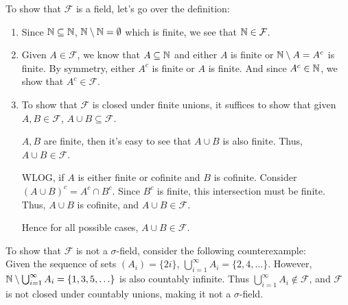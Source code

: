 \documentclass[12pt]{article}
\begin{document}
\begin{problem}[2]
	To show that $\mathcal{F}$ is a field, let's go over the definition:
	\begin{enumerate}[label=(\roman*)]
		\item Since $\mathbb{N} \subseteq \mathbb{N}$, $\mathbb{N} \setminus \mathbb{N} = \emptyset$ which is finite, we see that $\mathbb{N} \in \mathcal{F}$.
		\item Given $A \in \mathcal{F}$, we know that $A \subseteq \mathbb{N}$ and either $A$ is finite or  $\mathbb{N} \setminus A = A^{c}$ is finite. By symmetry, either $A^{c}$ is finite or $A$ is finite. And since  $A^{c} \in \mathbb{N}$, we show that $A^{c} \in \mathcal{F}$.
		\item To show that $\mathcal{F}$ is closed under finite unions, it suffices to show that given $A,B \in \mathcal{F}$, $A \cup B \subseteq \mathcal{F}$.
			~\begin{case}[1]
				$A,B$ are finite, then it's easy to see that  $A \cup  B$ is also finite. Thus, $A \cup B \in \mathcal{F}$.
			\end{case}
\begin{case}[2]
	WLOG, if $A$ is either finite or cofinite and $B$ is cofinite. Consider $(A \cup B)^{c} = A^{c} \cap B^{c}$. Since $B^{c}$ is finite, this intersection must be finite. Thus, $A \cup B$ is cofinite, and $A \cup B \in \mathcal{F}$.
\end{case} 
Hence for all possible cases, $A \cup B \in \mathcal{F}$.
	\end{enumerate}

	To show that $\mathcal{F}$ is not a $\sigma$-field, consider the following counterexample:\\

	Given the sequence of sets $(A_i) = \{2i\} $, $\bigcup_{i= 1}^{\infty} A_i = \{2,4,\ldots\} $. However, $\mathbb{N} \setminus \bigcup_{i= 1}^{\infty} A_i = \{1,3,5,\ldots\} $ is also countably infinite. Thus $\bigcup_{i=1}^{\infty} A_i \not \in \mathcal{F}$, and $\mathcal{F}$ is not closed under countably unions, making it not a $\sigma$-field.
\end{problem}
\newpage
\end{document}
